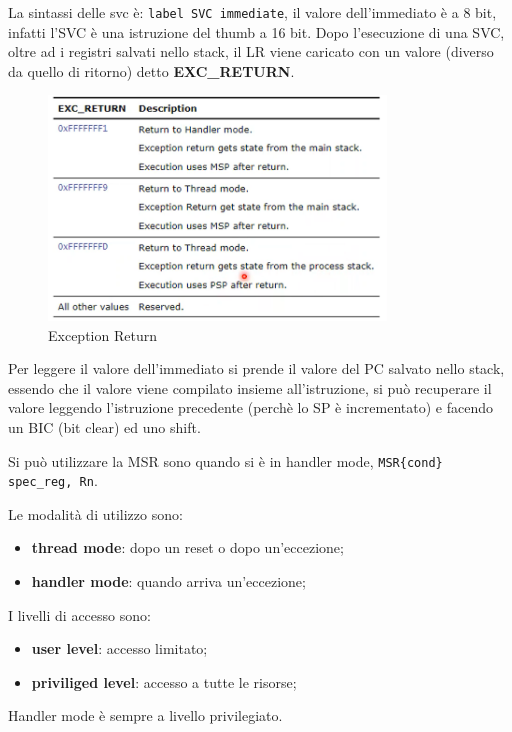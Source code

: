 \documentclass[12pt]{article}
\begin{document}
La sintassi delle svc \`e: \texttt{{label} SVC immediate}, il valore dell'immediato \`e a 8 bit, infatti l'SVC \`e una istruzione del thumb a 16 bit. Dopo l'esecuzione di una SVC, oltre ad i registri salvati nello stack, il LR viene caricato con un valore (diverso da quello di ritorno) detto \textbf{EXC\_RETURN}. 
\begin{figure}[H]
    \centering
    \includegraphics[width=0.8\textwidth]{exception-return.png}
    \caption{Exception Return}
    \label{fig:exception-return}
\end{figure}
Per leggere il valore dell'immediato si prende il valore del PC salvato nello stack, essendo che il valore viene compilato insieme all'istruzione, si pu\`o recuperare il valore leggendo l'istruzione precedente (perch\`e lo SP \`e incrementato) e facendo un BIC (bit clear) ed uno shift.

Si pu\`o utilizzare la MSR sono quando si \`e in handler mode, \texttt{MSR\{cond\} spec\_reg, Rn}.

Le modalit\`a di utilizzo sono:
\begin{itemize}
    \item \textbf{thread mode}: dopo un reset o dopo un'eccezione;
    \item \textbf{handler mode}: quando arriva un'eccezione;
\end{itemize}
I livelli di accesso sono:
\begin{itemize}
    \item \textbf{user level}: accesso limitato;
    \item \textbf{priviliged level}: accesso a tutte le risorse;
\end{itemize}
Handler mode \`e sempre a livello privilegiato.
\end{document}
